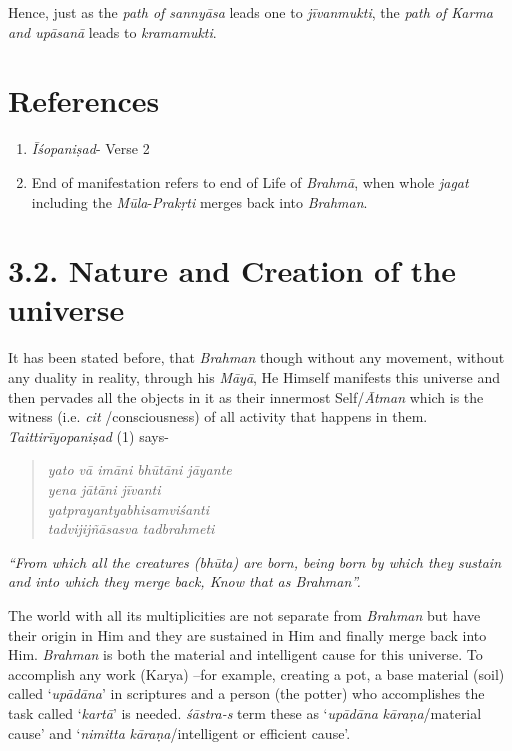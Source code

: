 Hence, just as the \emph{path of sannyāsa} leads one to \emph{jīvanmukti}, the \emph{path of Karma and upāsanā} leads to \emph{kramamukti}.

\section*{References}

\begin{enumerate}
\itemsep=0pt
\item
  \emph{Īśopaniṣad}- Verse 2
\item
  End of manifestation refers to end of Life of \emph{Brahmā}, when whole \emph{jagat} including the \emph{Mūla}-\emph{Prakṛti} merges back into \emph{Brahman}.
\end{enumerate}
\newpage

\section*{3.2. Nature and Creation of the universe}

It has been stated before, that \emph{Brahman} though without any movement, without any duality in reality, through his \emph{Māyā}, He Himself manifests this universe and then pervades all the objects in it as their innermost Self/\emph{Ātman} which is the witness (i.e. \emph{cit} /consciousness) of all activity that happens in them. \emph{Taittirīyopaniṣad} (1) says-

\begin{verse}
\emph{yato vā imāni bhūtāni jāyante}\\
\emph{yena jātāni jīvanti}\\
\emph{yatprayantyabhisamviśanti}\\
\emph{tadvijijñāsasva tadbrahmeti }
\end{verse}

\emph{``From which all the creatures (bhūta) are born, being born by which they sustain and into which they merge back, Know that as Brahman''.}

The world with all its multiplicities are not separate from \emph{Brahman} but have their origin in Him and they are sustained in Him and finally merge back into Him. \emph{Brahman} is both the material and intelligent cause for this universe. To accomplish any work (Karya) --for example, creating a pot, a base material (soil) called `\emph{upādāna}' in scriptures and a person (the potter) who accomplishes the task called `\emph{kartā}' is needed. \emph{śāstra-s} term these as `\emph{upādāna} \emph{kāraṇa}/material cause' and `\emph{nimitta} \emph{kāraṇa}/intelligent or efficient cause'.

